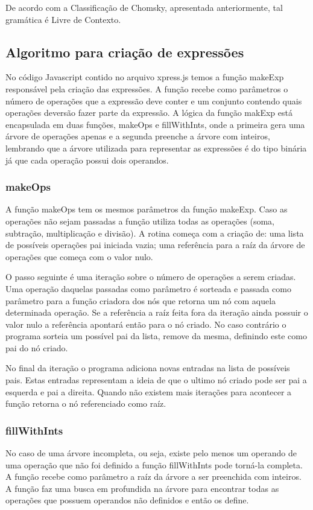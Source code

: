 	De acordo com a Classificação de Chomsky, apresentada anteriormente, tal gramática é Livre de Contexto.
	
\subsection{Algoritmo para criação de expressões}
No código Javascript contido no arquivo xpress.js temos a função makeExp responsável pela criação das expressões. A função recebe como parâmetros o número de operações que a expressão deve conter e um conjunto contendo quais operações deversão fazer parte da expressão. A lógica da função makExp está encapsulada em duas funções, makeOps e fillWithInts, onde a primeira gera uma árvore de operações apenas e a segunda preenche a árvore com inteiros, lembrando que a árvore utilizada para representar as expressões é do tipo binária já que cada operação possui dois operandos.

\subsubsection{makeOps}
A função makeOps tem os mesmos parâmetros da função makeExp. Caso as operações não sejam passadas a função utiliza todas as operações (soma, subtração, multiplicação e divisão). A rotina começa com a criação de: uma lista de possíveis operações pai iniciada vazia; uma referência para a raíz da árvore de operações que começa com o valor nulo.

	O passo seguinte é uma iteração sobre o número de operações a serem criadas. Uma operação daquelas passadas como parâmetro é sorteada e passada como parâmetro para a função criadora dos nós que retorna um nó com aquela determinada operação. Se a referência a raíz feita fora da iteração ainda possuir o valor nulo a referência apontará então para o nó criado. No caso contrário o programa sorteia um possível pai da lista, remove da mesma, definindo este como pai do nó criado. 
	
	No final da iteração o programa adiciona novas entradas na lista de possíveis pais. Estas entradas representam a ideia de que o ultimo nó criado pode ser pai a esquerda e pai a direita. Quando não existem mais iterações para acontecer a função retorna o nó referenciado como raíz.
	
\subsubsection{fillWithInts}
No caso de uma árvore incompleta, ou seja, existe pelo menos um operando de uma operação que não foi definido a função fillWithInts pode torná-la completa. A função recebe como parâmetro a raíz da árvore a ser preenchida com inteiros. A função faz uma busca em profundida na árvore para encontrar todas as operações que possuem operandos não definidos e então os define.

